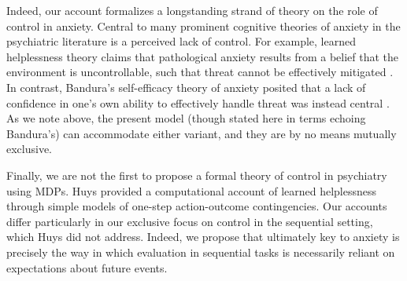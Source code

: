 \documentclass[11pt]{article} %
\begin{document}
Indeed, our account formalizes a longstanding strand of theory on the role of control in anxiety. Central to many prominent cognitive theories of anxiety in the psychiatric literature is a perceived lack of control. For example, learned helplessness theory claims that pathological anxiety results from a belief that the environment is uncontrollable, such that threat cannot be effectively mitigated \cite{alloy1990}. In contrast, Bandura's self-efficacy theory of anxiety posited that a lack of confidence in one's own ability to effectively handle threat was instead central \cite{bandura1977}. As we note above, the present model (though stated here in terms echoing Bandura's) can accommodate either variant, and they are by no means mutually exclusive. 

Finally, we are not the first to propose a formal theory of control in psychiatry using MDPs. Huys\cite{HuysDayan2009} provided a computational account of learned helplessness through simple models of one-step action-outcome contingencies. Our accounts differ particularly in our exclusive focus on control in the sequential setting, which Huys did not address. Indeed, we propose that ultimately key to anxiety is precisely the way in which evaluation in sequential tasks is necessarily reliant on expectations about future events.


\small{}
\end{document}
